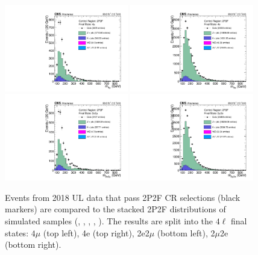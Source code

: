 \begin{figure}[!htbp]
	\begin{center}
		\includegraphics[width=0.48\textwidth]{figures/higgsmassmeas/redbkg/cr/UL2018_CR_2P2F_4mu.pdf}
		\includegraphics[width=0.48\textwidth]{figures/higgsmassmeas/redbkg/cr/UL2018_CR_2P2F_4e.pdf}
		\includegraphics[width=0.48\textwidth]{figures/higgsmassmeas/redbkg/cr/UL2018_CR_2P2F_2e2mu.pdf}
		\includegraphics[width=0.48\textwidth]{figures/higgsmassmeas/redbkg/cr/UL2018_CR_2P2F_2mu2e.pdf}
		\caption{
			Events from 2018 UL data that pass 2P2F CR selections (black markers) 
			are compared to the stacked 2P2F distributions of simulated samples
			(\Zplusjets, \ttbarplusjets, \WZ, \ZZ, \Zgammastar).
			The results are split into the $4\ell$ final states:
			$4\mu$ (top left), 4e (top right), 2e2$\mu$ (bottom left), 2$\mu$2e (bottom right).
		}
		\label{cr_plots_2p2f_2018}
	\end{center}
\end{figure}
